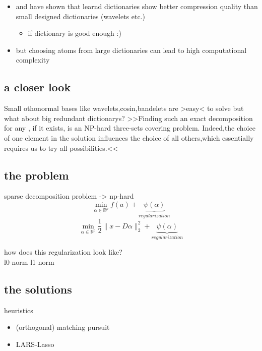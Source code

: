 \begin{frame}
\begin{itemize}
\item \cite{Chen1999} and \cite{Aharon2006} have shown that learnd dictionaries show better compression quality
than small designed dictionaries (wavelets etc.)
\pause
		\begin{itemize}
		\item if dictionary is good enough :)
  		\end{itemize}

\item but choosing atoms from large dictionaries can lead to high computational complexity
\end{itemize}
\end{frame}

\subsection{a closer look}
\begin{frame}
Small othonormal bases like wavelets,cosin,bandelets are >easy< to solve but what about big redundant dictionarys?
>>Finding such an exact decomposition for any , if it exists, is an NP-hard three-sets
covering problem. Indeed,the choice of one element in the solution influences the
choice of all others,which essentially requires us to try all possibilities.<<
\end{frame}






\subsection{the problem}
\begin{frame}
sparse decomposition problem -> np-hard
\[ 
\min_{\alpha\in\mathbb{R}^{p}} f(a) + \underbrace{\psi(\alpha)}_{regularization} 
\]
\[
\min_{\alpha\in\mathbb{R}^{p}} \frac{1}{2} \lVert x - D\alpha \rVert^{2}_{2} + \underbrace{\psi(\alpha)}_{regularization}
\] 

how does this regularization look like? \\
l0-norm l1-norm

\end{frame}

\subsection{the solutions}
\begin{frame}
heuristics
\begin{itemize}
\item (orthogonal) matching pursuit
\item LARS-Lasso
\end{itemize}
\end{frame}


